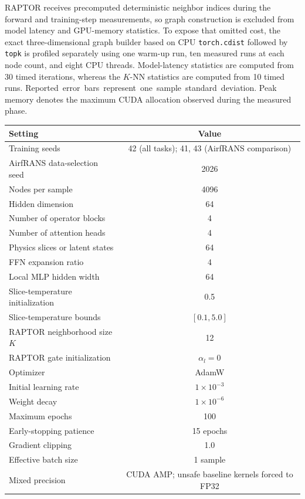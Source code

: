 \documentclass[a4paper,fleqn]{cas-sc}
\begin{document}
RAPTOR receives precomputed deterministic neighbor indices during the
forward and training-step measurements, so graph construction is excluded
from model latency and GPU-memory statistics. To expose that omitted cost,
the exact three-dimensional graph builder based on CPU
\texttt{torch.cdist} followed by \texttt{topk} is profiled separately using
one warm-up run, ten measured runs at each node count, and eight CPU
threads. Model-latency statistics are computed from 30 timed iterations,
whereas the \(K\)-NN statistics are computed from 10 timed runs.
\mbox{Reported error bars represent one sample standard deviation.} Peak memory denotes
the maximum CUDA allocation observed during the measured phase. 

\begin{center}
    \begin{minipage}{0.88\linewidth}
        \centering
    \label{tab:training_protocol}
    \renewcommand{\arraystretch}{1.12}
    \setlength{\tabcolsep}{5pt}
    \begin{tabular}{lc}
        \toprule
        Setting & Value \\
        \midrule
        Training seeds & 42 (all tasks); 41, 43 (AirfRANS comparison) \\
        AirfRANS data-selection seed & 2026 \\
        Nodes per sample & 4096 \\
        Hidden dimension & 64 \\
        Number of operator blocks & 4 \\
        Number of attention heads & 4 \\
        Physics slices or latent states & 64 \\
        FFN expansion ratio & 4 \\
        Local MLP hidden width & 64 \\
        Slice-temperature initialization & 0.5 \\
        Slice-temperature bounds & \([0.1,5.0]\) \\
        RAPTOR neighborhood size \(K\) & 12 \\
        RAPTOR gate initialization & \(\alpha_l=0\) \\
        Optimizer & AdamW \\
        Initial learning rate & \(1\times10^{-3}\) \\
        Weight decay & \(1\times10^{-6}\) \\
        Maximum epochs & 100 \\
        Early-stopping patience & 15 epochs \\
        Gradient clipping & 1.0 \\
        Effective batch size & 1 sample \\
        Mixed precision & CUDA AMP; unsafe baseline kernels forced to FP32 \\
        \bottomrule
    \end{tabular}
    \end{minipage}
\end{center}
\end{document}
